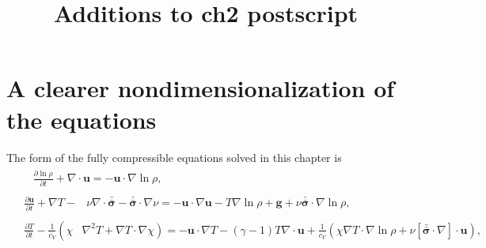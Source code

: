 \documentclass[aps, pre, onecolumn, nofootinbib, notitlepage, groupedaddress, amsfonts, amssymb, amsmath, longbibliography, superscriptaddress]{revtex4-1}
\newcommand{\grad}{\ensuremath{\nabla}}
\newcommand{\lilstressT}{\ensuremath{\bm{\bar{\bar{\sigma}}}}}
\begin{document}

\title{Additions to ch2 postscript}

\maketitle


\section{A clearer nondimensionalization of the equations}
\label{sec:introduction}
The form of the fully compressible equations solved in this chapter is
\begin{align}
&\begin{aligned}
&\frac{\partial \ln\rho}{\partial t} + \grad\cdot\bm{u} 
    = -\bm{u}\cdot\grad\ln\rho,
	\label{eqn:ab17continuity_eqn}
\end{aligned}\\
&\begin{aligned}
\frac{\partial\bm{u}}{\partial t} + \grad T - 
&\nu\grad\cdot\lilstressT - \lilstressT\cdot\grad\nu =
-\bm{u}\cdot\grad\bm{u} - T\grad\ln\rho + \bm{g} + 
\nu\lilstressT\cdot\grad\ln\rho,
\label{eqn:ab17momentum_eqn}
\end{aligned}\\
&\begin{aligned}
\frac{\partial T}{\partial t} -\frac{1}{c_V}\left(\right.\chi&\left.
    \grad^2 T + \grad T\cdot\grad\chi\right) =
	-\bm{u}\cdot\grad T - (\gamma-1)T\grad\cdot{\bm{u}}
	+ \frac{1}{c_V}\left(\chi\grad T \cdot\grad\ln\rho +
	\nu\left[\lilstressT\cdot\nabla\right]\cdot\bm{u}\right), 
	\label{eqn:ab17energy_eqn}
\end{aligned}
\end{align}
\end{document}
